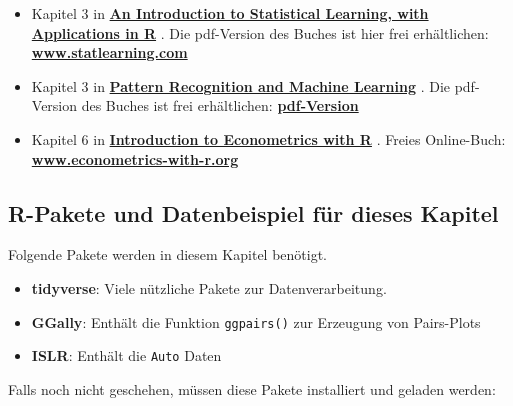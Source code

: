 \documentclass[
  ngerman,
]{book}
\providecommand{\tightlist}{%
  \setlength{\itemsep}{0pt}\setlength{\parskip}{0pt}}
\begin{document}
\begin{itemize}
\item
  Kapitel 3 in \href{https://trevorhastie.github.io/ISLR/}{\textbf{An Introduction to Statistical Learning, with Applications in R}} \citep{ISLR2021}.
  Die pdf-Version des Buches ist hier frei erhältlichen:
  \href{https://www.statlearning.com/}{\textbf{www.statlearning.com}}
\item
  Kapitel 3 in \href{https://www.microsoft.com/en-us/research/uploads/prod/2006/01/Bishop-Pattern-Recognition-and-Machine-Learning-2006.pdf}{\textbf{Pattern Recognition and Machine Learning}} \citep{book_Bishop2006}.
  Die pdf-Version des Buches ist frei erhältlichen: \href{https://www.microsoft.com/en-us/research/uploads/prod/2006/01/Bishop-Pattern-Recognition-and-Machine-Learning-2006.pdf}{\textbf{pdf-Version}}
\item
  Kapitel 6 in \href{https://www.econometrics-with-r.org/}{\textbf{Introduction to Econometrics with R}} \citep{IntroEconometricsR2021}.
  Freies Online-Buch: \href{https://www.econometrics-with-r.org/}{\textbf{www.econometrics-with-r.org}}
\end{itemize}

\hypertarget{r-pakete-und-datenbeispiel-fuxfcr-dieses-kapitel}{%
\subsection*{R-Pakete und Datenbeispiel für dieses Kapitel}\label{r-pakete-und-datenbeispiel-fuxfcr-dieses-kapitel}}

Folgende Pakete werden in diesem Kapitel benötigt.

\begin{itemize}
\tightlist
\item
  \textbf{tidyverse}: Viele nützliche Pakete zur Datenverarbeitung.
\item
  \textbf{GGally}: Enthält die Funktion \texttt{ggpairs()} zur Erzeugung von Pairs-Plots
\item
  \textbf{ISLR}: Enthält die \texttt{Auto} Daten
\end{itemize}

Falls noch nicht geschehen, müssen diese Pakete installiert und geladen werden:
\end{document}
